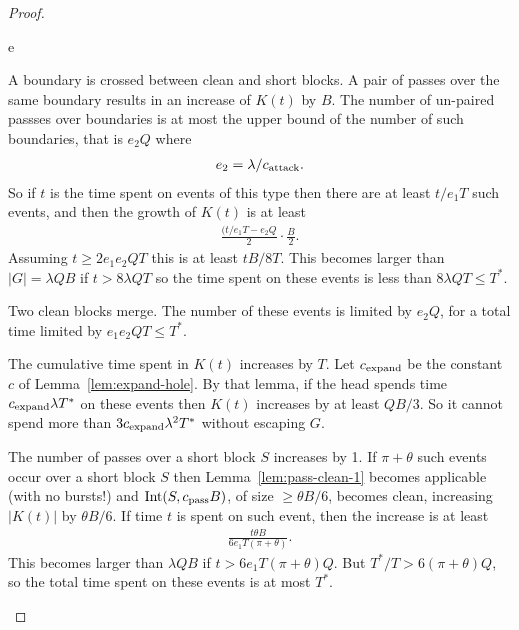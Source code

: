 \documentclass[11pt]{memoir}
\theoremstyle{definition} %
\renewcommand{\le}{\leq}
\renewcommand{\ge}{\geq}
\def\B{B}
\newcommand{\Int}{\mathrm{Int}}
\newcommand{\passno}{\pi}
\newcommand{\Q}{Q}
\newcommand{\Tu}{T}
\newcommand{\Tus}{T^{*}}
\newcommand{\cns}[1]{c_{\textrm{\upshape #1}}}
\newcommand{\CAtt}{\cns{attack}}
\newcommand{\CPass}{\cns{pass}}
\begin{document}
\begin{proof}
  \begin{varenum}{e}

  \item\label{i:cross} A boundary is crossed between clean and short blocks.
    A pair of passes over the same boundary results in an increase of \( K(t) \) by \( \B \).
    The number of un-paired passses over boundaries is at most the upper bound of the number of
    such boundaries, that is \( e_{2}\Q \) where
    \begin{align*}
      e_{2} = \lambda/\CAtt.
 \end{align*}
    So if \( t \) is the time spent on events of this type then there are at least \( t/e_{1}\Tu \)
    such events, and then the growth of \( K(t) \) is at least
    \begin{align*}
      \frac{(t/e_{1}\Tu - e_{2}\Q}{2}\cdot\frac{\B}{2}.
    \end{align*}
    Assuming \( t\ge 2 e_{1}e_{2}\Q\Tu \) this is at least \( t\B/8\Tu \).
    This becomes larger than \( |G|=\lambda\Q\B \) if \( t>8\lambda\Q\Tu \)
    so the time spent on these events is less than \( 8\lambda\Q\Tu\le\Tus \).

  \item\label{i:merge} Two clean blocks merge.
    The number of these events is limited by \( e_{2}\Q \), for a total time limited by \( e_{1}e_{2}\Q\Tu \le\Tus\).

  \item\label{i:cum-incr} The cumulative time spent in \( K(t) \) increases by \( \Tu \).
    Let \( \cns{expand} \) be the constant \( c \) of Lemma~\ref{lem:expand-hole}.
    By that lemma, if the head spends time \( \cns{expand}\lambda\Tu^{*} \)
    on these events then \( K(t) \) increases by at least \( \Q\B/3 \).
    So it cannot spend more than \( 3\cns{expand}\lambda^{2}\Tus \) without escaping \( G \).    
    
  \item\label{i:passes} The number of passes over a short block \( S  \) increases by 1.
    If \( \passno+\theta \) such events occur over a short block \( S \)
    then Lemma~\ref{lem:pass-clean-1} becomes
    applicable (with no bursts!) and \( \Int(S,\CPass\B) \), of size \( \ge \theta\B/6 \), becomes clean,
    increasing \( |K(t)| \) by \( \theta\B/6 \).
    If time \( t \) is spent on such event, then the increase is at least
    \begin{align*}
   \frac{t\theta\B}{6 e_{1}\Tu(\passno+\theta)}.
    \end{align*}
    This becomes larger than \( \lambda\Q\B \) if \( t>6e_{1}\Tu(\passno+\theta)\Q \).
    But \( \Tus/\Tu>6(\passno+\theta)\Q \), so the total time spent on these events is at most \( \Tus \).  
  \end{varenum}

  
\end{proof}
\end{document}
